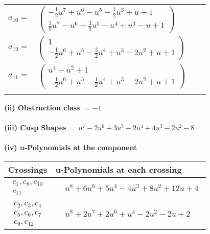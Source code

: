 \documentclass[1p]{elsarticle_modified}
\theoremstyle{definition}
\begin{document}
\begin{tabular}{m{7pt} m{180pt} m{7pt} m{180pt} }
\flushright $a_{10}=$&$\begin{pmatrix}-\frac{1}{2} u^7+u^6- u^5-\frac{1}{2} u^3+u-1\\\frac{1}{2} u^7- u^6+\frac{3}{2} u^5- u^4+u^3- u+1\end{pmatrix}$ \\
\flushright $a_{12}=$&$\begin{pmatrix}1\\-\frac{1}{2} u^6+u^5-\frac{3}{2} u^4+u^3-2 u^2+u+1\end{pmatrix}$ \\
\flushright $a_{11}=$&$\begin{pmatrix}u^4- u^2+1\\-\frac{1}{2} u^6+u^5-\frac{1}{2} u^4+u^3-2 u^2+u+1\end{pmatrix}$\\&\end{tabular}
\flushleft \textbf{(ii) Obstruction class $= -1$}\\~\\
\flushleft \textbf{(iii) Cusp Shapes $= u^7-2 u^6+3 u^5-2 u^4+4 u^3-2 u^2-8$}\\~\\
\newpage\renewcommand{\arraystretch}{1}
\flushleft \textbf{(iv) u-Polynomials at the component}\newline \\
\begin{tabular}{m{50pt}|m{274pt}}
Crossings & \hspace{64pt}u-Polynomials at each crossing \\
\hline $$\begin{aligned}c_{1},c_{8},c_{10}\\c_{11}\end{aligned}$$&$\begin{aligned}
&u^8+6 u^6+5 u^4-4 u^3+8 u^2+12 u+4
\end{aligned}$\\
\hline $$\begin{aligned}c_{2},c_{3},c_{4}\\c_{5},c_{6},c_{7}\\c_{9},c_{12}\end{aligned}$$&$\begin{aligned}
&u^8+2 u^7+2 u^6+u^4-2 u^2-2 u+2
\end{aligned}$\\
\hline
\end{tabular}\\~\\
\newpage\renewcommand{\arraystretch}{1}
\end{document}
